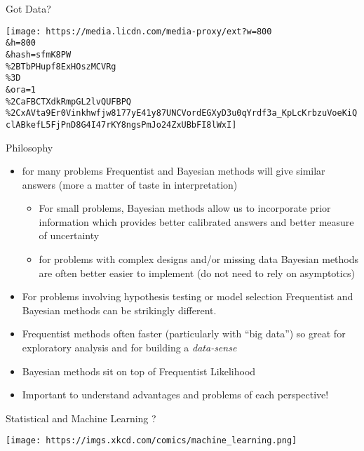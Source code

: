 \documentclass[ignorenonframetext,]{beamer}
\providecommand{\tightlist}{%
  \setlength{\itemsep}{0pt}\setlength{\parskip}{0pt}}
\begin{document}
\begin{frame}{Got Data?}
\protect\hypertarget{got-data}{}

\texttt{[image: https://media.licdn.com/media-proxy/ext?w=800\\\&h=800\\\&hash=sfmK8PW\\\%2BTbPHupf8ExHOszMCVRg\\\%3D\\\&ora=1\\\%2CaFBCTXdkRmpGL2lvQUFBPQ\\\%2CxAVta9Er0Vinkhwfjw8177yE41y87UNCVordEGXyD3u0qYrdf3a\_KpLcKrbzuVoeKiQclABkefL5FjPnD8G4I47rKY8ngsPmJo24ZxUBbFI8lWxI]}

\end{frame}

\begin{frame}{Philosophy}
\protect\hypertarget{philosophy}{}

\begin{itemize}[<+->]
\item
  for many problems Frequentist and Bayesian methods will give similar
  answers (more a matter of taste in interpretation)

  \begin{itemize}[<+->]
  \tightlist
  \item
    For small problems, Bayesian methods allow us to incorporate prior
    information which provides better calibrated answers and better
    measure of uncertainty
  \item
    for problems with complex designs and/or missing data Bayesian
    methods are often better easier to implement (do not need to rely on
    asymptotics)
  \end{itemize}
\item
  For problems involving hypothesis testing or model selection
  Frequentist and Bayesian methods can be strikingly different.
\item
  Frequentist methods often faster (particularly with ``big data'') so
  great for exploratory analysis and for building a \emph{data-sense}
\item
  Bayesian methods sit on top of Frequentist Likelihood
\item
  Important to understand advantages and problems of each perspective!
\end{itemize}

\end{frame}

\begin{frame}{Statistical and Machine Learning ?}
\protect\hypertarget{statistical-and-machine-learning}{}

\texttt{[image: https://imgs.xkcd.com/comics/machine\_learning.png]}

\end{frame}
\end{document}

